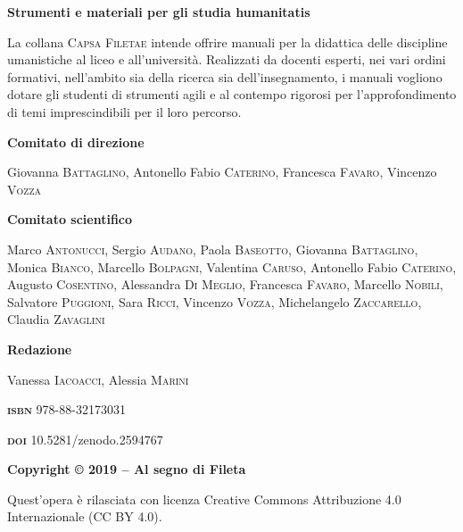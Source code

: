 \thispagestyle{empty}

\setlength{\parindent}{0pt}
\textbf{Strumenti e materiali per gli studia humanitatis}

La collana \textsc{Capsa Filetae} intende offrire manuali per la
didattica delle discipline umanistiche al liceo e all'università.
Realizzati da docenti esperti, nei vari ordini formativi, nell'ambito
sia della ricerca sia dell'insegnamento, i manuali vogliono dotare gli
studenti di strumenti agili e al contempo rigorosi per l'approfondimento
di temi imprescindibili per il loro percorso.

\vspace{2em}

\textbf{Comitato di direzione}

Giovanna \textsc{Battaglino}, Antonello Fabio \textsc{Caterino}, 
Francesca \textsc{Favaro}, Vincenzo \textsc{Vozza}

\vspace{2em}

\textbf{Comitato scientifico}

Marco \textsc{Antonucci}, Sergio \textsc{Audano,} Paola
\textsc{Baseotto}, Giovanna \textsc{Battaglino}, Monica \textsc{Bianco},
Marcello \textsc{Bolpagni}, Valentina \textsc{Caruso}, Antonello Fabio 
\textsc{Caterino}, Augusto \textsc{Cosentino}, Alessandra \textsc{Di}
\textsc{Meglio}, Francesca \textsc{Favaro}, Marcello \textsc{Nobili},
Salvatore \textsc{Puggioni}, Sara \textsc{Ricci}, Vincenzo
\textsc{Vozza}, Michelangelo \textsc{Zaccarello}, Claudia
\textsc{Zavaglini}


\vspace{2em}

\textbf{Redazione}

Vanessa \textsc{Iacoacci}, Alessia \textsc{Marini}


\vspace{2em}

\textbf{\textsc{isbn}} 978-88-32173031

\textbf{\textsc{doi}} 10.5281/zenodo.2594767

\vspace{1em}
\textbf{Copyright © 2019 -- Al segno di Fileta}

Quest'opera è rilasciata con licenza Creative Commons Attribuzione 4.0 Internazionale (CC BY 4.0). 



\setlength{\parindent}{1em}


{
\setcounter{tocdepth}{0}
\tableofcontents
}

